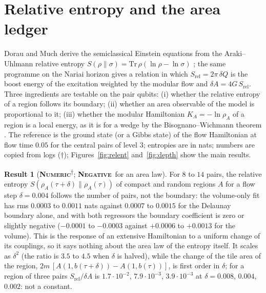 \documentclass[11pt]{article}
\newcommand{\numeric}{\textbf{\textsc{Numeric}}}
\newcommand{\negres}{\textbf{\textsc{Negative}}}
\newcommand{\snap}{\textsuperscript{$\dagger$}}      %
\theoremstyle{definition}
\newtheorem{result}{Result}
\begin{document}
\section{Relative entropy and the area ledger}\label{sec:rel}
Dorau and Much \cite{doraumuch} derive the semiclassical Einstein equations from the Araki--Uhlmann relative entropy $S(\rho\|\sigma)=\mathrm{Tr}\,\rho(\ln\rho-\ln\sigma)$ \cite{umegaki1962,araki1976}; the same programme on the Nariai horizon gives a relation in which $S_{\mathrm{rel}}=2\pi\,\delta Q$ is the boost energy of the excitation weighted by the modular flow and $\delta A=4G\,S_{\mathrm{rel}}$. Three ingredients are testable on the pair qubits: (i) whether the relative entropy of a region follows its boundary; (ii) whether an area observable of the model is proportional to it; (iii) whether the modular Hamiltonian $K_A=-\ln\rho_A$ of a region is a local energy, as it is for a wedge by the Bisognano--Wichmann theorem \cite{bisognano1975}. The reference is the ground state (or a Gibbs state) of the flow Hamiltonian at flow time $0.05$ for the central pairs of level $3$; entropies are in nats; numbers are copied from logs ($\dagger$); Figures~\ref{fig:relent} and~\ref{fig:depth} show the main results.
\begin{result}[\numeric\snap; \negres\ for an area law]\label{res:rel-volume}
For $8$ to $14$ pairs, the relative entropy $S(\rho_A(\tau+\delta)\|\rho_A(\tau))$ of compact and random regions $A$ for a flow step $\delta=0.004$ follows the number of pairs, not the boundary: the volume-only fit has rms $0.0003$ to $0.0011$ nats against $0.0007$ to $0.0015$ for the Delaunay boundary alone, and with both regressors the boundary coefficient is zero or slightly negative ($-0.0001$ to $-0.0003$ against $+0.0006$ to $+0.0013$ for the volume). This is the response of an extensive Hamiltonian to a uniform change of its couplings, so it says nothing about the area law of the entropy itself. It scales as $\delta^2$ (the ratio is $3.5$ to $4.5$ when $\delta$ is halved), while the change of the tile area of the region, $2m\,[A(1,b(\tau+\delta))-A(1,b(\tau))]$, is first order in $\delta$; for a region of three pairs $S_{\mathrm{rel}}/\delta A$ is $1.7\cdot10^{-2}$, $7.9\cdot10^{-3}$, $3.9\cdot10^{-3}$ at $\delta=0.008$, $0.004$, $0.002$: not a constant.
\end{result}
\end{document}
